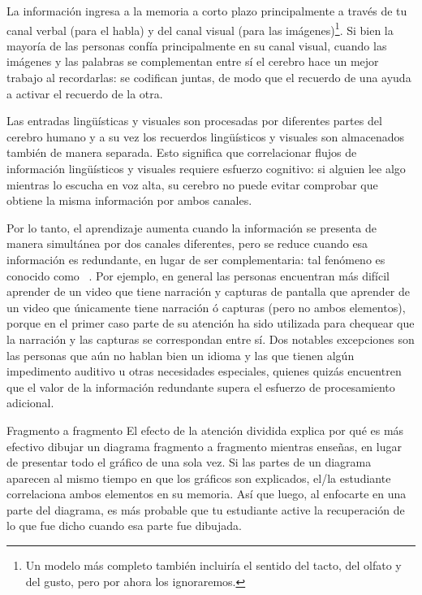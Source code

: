 La información ingresa a la memoria a corto plazo principalmente
a través de tu canal verbal (para el habla)
y del canal visual
(para las imágenes)\footnote{
  Un modelo más completo
  también incluiría el sentido del tacto, del olfato y del gusto,
  pero por ahora los ignoraremos.}.
Si bien la mayoría de las personas confía principalmente en su canal visual,
cuando las imágenes y las palabras se complementan entre sí
el cerebro hace un mejor trabajo al recordarlas:
se codifican juntas,
de modo que el recuerdo de una ayuda a activar el recuerdo de la otra.

Las entradas lingüísticas y visuales son procesadas por diferentes partes del cerebro humano
y a su vez los recuerdos lingüísticos y visuales son almacenados también de manera separada.
Esto significa que correlacionar flujos de información lingüísticos y visuales requiere esfuerzo cognitivo:
si alguien lee algo mientras lo escucha en voz alta,
su cerebro no puede evitar comprobar que obtiene la misma información por ambos canales.

Por lo tanto, el aprendizaje aumenta cuando la información se presenta de manera simultánea por dos canales diferentes,
pero se reduce cuando esa información es redundante, en lugar de ser complementaria:
tal fenómeno es conocido como ~\cite{Maye2003}.
Por ejemplo, en general las personas encuentran más difícil aprender de un video que tiene narración y
capturas de pantalla que aprender de un video que únicamente tiene narración ó capturas (pero no ambos elementos),
porque en el primer caso parte de su atención ha sido utilizada para chequear que la narración  
y las capturas se correspondan entre sí. Dos notables excepciones 
son las personas que aún no hablan bien un idioma y las que tienen algún impedimento auditivo u
otras necesidades especiales, quienes quizás encuentren que el valor de la información redundante
supera el esfuerzo de procesamiento adicional.

\begin{aside}{Fragmento a fragmento}
  El efecto de la atención dividida explica por qué es más efectivo dibujar un diagrama
  fragmento a fragmento mientras enseñas, en lugar de presentar todo el gráfico de una sola vez.
  Si las partes de un diagrama aparecen al mismo tiempo en que los gráficos son explicados,
  el/la estudiante correlaciona ambos elementos en su memoria.
  Así que luego, al enfocarte en una parte del diagrama, es más probable que tu estudiante active la recuperación
  de lo que fue dicho cuando esa parte fue dibujada.
\end{aside}


